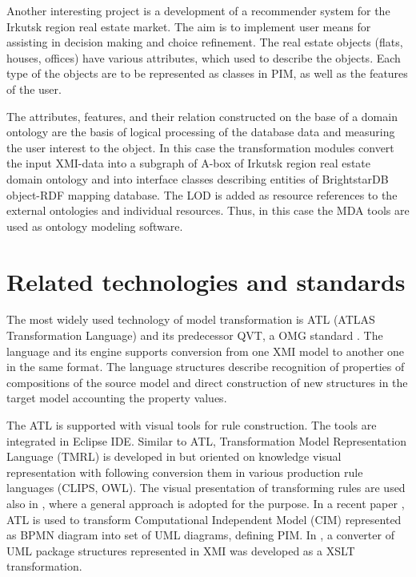 \documentclass[conference,a4paper]{IEEEtran}
\begin{document}
Another interesting project is a development of a recommender system for the Irkutsk region real estate market.  The aim is to implement user means for assisting in decision making and choice refinement.  The real estate objects (flats, houses, offices) have various attributes, which used to describe the objects.  Each type of the objects are to be represented as classes in PIM, as well as the features of the user.

The attributes, features, and their relation constructed on the base of a domain ontology are the basis of logical processing of the database data and measuring the user interest to the object.  In this case the transformation modules convert the input XMI-data into a subgraph of A-box of Irkutsk region real estate domain ontology and into interface classes describing entities of BrightstarDB object-RDF mapping database.  The LOD is added as resource references to the external ontologies and individual resources.  Thus, in this case the MDA tools are used as ontology modeling software.

\section{Related technologies and standards}
\label{sec:rel}

The most widely used technology of model transformation is ATL (ATLAS Transformation Language) \cite{atl} and its predecessor QVT, a OMG standard \cite{QVT}.  The language and its engine supports conversion from one XMI model to another one in the same format.  The language structures describe recognition of properties of compositions of the source model and direct construction of new structures in the target model accounting the property values.

The ATL is supported with visual tools for rule construction.  The tools are integrated in Eclipse IDE.  Similar to ATL, Transformation Model Representation Language (TMRL) is developed in \cite{nikita} but oriented on knowledge visual representation with following conversion them in various production rule languages (CLIPS, OWL).  The visual presentation of transforming rules are used also in \cite{GT}, where a general approach is adopted for the purpose.  In a recent paper \cite{azis}, ATL is used to transform Computational Independent Model (CIM) represented as BPMN diagram into set of UML diagrams, defining PIM.  In \cite{uml2owl}, a converter of UML package structures represented in XMI was developed as a XSLT transformation.
\end{document}
